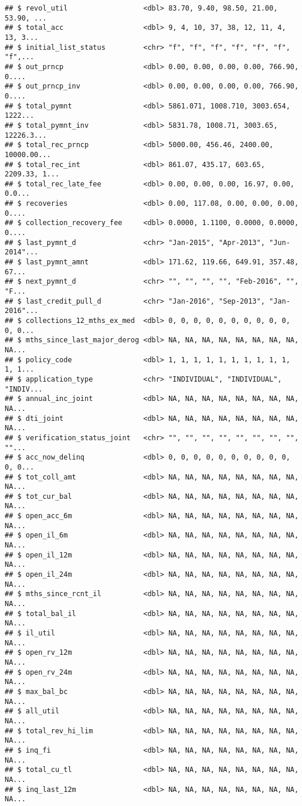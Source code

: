 \documentclass[]{article}
\begin{document}
\begin{verbatim}
## $ revol_util                  <dbl> 83.70, 9.40, 98.50, 21.00, 53.90, ...
## $ total_acc                   <dbl> 9, 4, 10, 37, 38, 12, 11, 4, 13, 3...
## $ initial_list_status         <chr> "f", "f", "f", "f", "f", "f", "f",...
## $ out_prncp                   <dbl> 0.00, 0.00, 0.00, 0.00, 766.90, 0....
## $ out_prncp_inv               <dbl> 0.00, 0.00, 0.00, 0.00, 766.90, 0....
## $ total_pymnt                 <dbl> 5861.071, 1008.710, 3003.654, 1222...
## $ total_pymnt_inv             <dbl> 5831.78, 1008.71, 3003.65, 12226.3...
## $ total_rec_prncp             <dbl> 5000.00, 456.46, 2400.00, 10000.00...
## $ total_rec_int               <dbl> 861.07, 435.17, 603.65, 2209.33, 1...
## $ total_rec_late_fee          <dbl> 0.00, 0.00, 0.00, 16.97, 0.00, 0.0...
## $ recoveries                  <dbl> 0.00, 117.08, 0.00, 0.00, 0.00, 0....
## $ collection_recovery_fee     <dbl> 0.0000, 1.1100, 0.0000, 0.0000, 0....
## $ last_pymnt_d                <chr> "Jan-2015", "Apr-2013", "Jun-2014"...
## $ last_pymnt_amnt             <dbl> 171.62, 119.66, 649.91, 357.48, 67...
## $ next_pymnt_d                <chr> "", "", "", "", "Feb-2016", "", "F...
## $ last_credit_pull_d          <chr> "Jan-2016", "Sep-2013", "Jan-2016"...
## $ collections_12_mths_ex_med  <dbl> 0, 0, 0, 0, 0, 0, 0, 0, 0, 0, 0, 0...
## $ mths_since_last_major_derog <dbl> NA, NA, NA, NA, NA, NA, NA, NA, NA...
## $ policy_code                 <dbl> 1, 1, 1, 1, 1, 1, 1, 1, 1, 1, 1, 1...
## $ application_type            <chr> "INDIVIDUAL", "INDIVIDUAL", "INDIV...
## $ annual_inc_joint            <dbl> NA, NA, NA, NA, NA, NA, NA, NA, NA...
## $ dti_joint                   <dbl> NA, NA, NA, NA, NA, NA, NA, NA, NA...
## $ verification_status_joint   <chr> "", "", "", "", "", "", "", "", ""...
## $ acc_now_delinq              <dbl> 0, 0, 0, 0, 0, 0, 0, 0, 0, 0, 0, 0...
## $ tot_coll_amt                <dbl> NA, NA, NA, NA, NA, NA, NA, NA, NA...
## $ tot_cur_bal                 <dbl> NA, NA, NA, NA, NA, NA, NA, NA, NA...
## $ open_acc_6m                 <dbl> NA, NA, NA, NA, NA, NA, NA, NA, NA...
## $ open_il_6m                  <dbl> NA, NA, NA, NA, NA, NA, NA, NA, NA...
## $ open_il_12m                 <dbl> NA, NA, NA, NA, NA, NA, NA, NA, NA...
## $ open_il_24m                 <dbl> NA, NA, NA, NA, NA, NA, NA, NA, NA...
## $ mths_since_rcnt_il          <dbl> NA, NA, NA, NA, NA, NA, NA, NA, NA...
## $ total_bal_il                <dbl> NA, NA, NA, NA, NA, NA, NA, NA, NA...
## $ il_util                     <dbl> NA, NA, NA, NA, NA, NA, NA, NA, NA...
## $ open_rv_12m                 <dbl> NA, NA, NA, NA, NA, NA, NA, NA, NA...
## $ open_rv_24m                 <dbl> NA, NA, NA, NA, NA, NA, NA, NA, NA...
## $ max_bal_bc                  <dbl> NA, NA, NA, NA, NA, NA, NA, NA, NA...
## $ all_util                    <dbl> NA, NA, NA, NA, NA, NA, NA, NA, NA...
## $ total_rev_hi_lim            <dbl> NA, NA, NA, NA, NA, NA, NA, NA, NA...
## $ inq_fi                      <dbl> NA, NA, NA, NA, NA, NA, NA, NA, NA...
## $ total_cu_tl                 <dbl> NA, NA, NA, NA, NA, NA, NA, NA, NA...
## $ inq_last_12m                <dbl> NA, NA, NA, NA, NA, NA, NA, NA, NA...
\end{verbatim}
\end{document}
